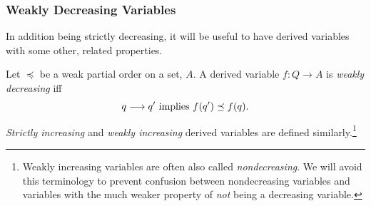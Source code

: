 \subsubsection{Weakly Decreasing Variables}

In addition being strictly decreasing, it will be useful to have derived
variables with some other, related properties.

\begin{definition}
Let $\preceq$ be a weak partial order on a set, $A$.  A derived variable
$f : Q \to A$ is \emph{weakly decreasing} iff
\[
q \mathrel{\longrightarrow} q' \text{  implies  } f(q') \preceq f(q).
\]

\emph{Strictly increasing} and \emph{weakly increasing} derived variables
are defined similarly.\footnote{Weakly increasing variables are often also
called \emph{nondecreasing}.  We will avoid this terminology to prevent
confusion between nondecreasing variables and variables with the much
weaker property of \emph{not} being a decreasing variable.}
\end{definition}
\fi

\begin{problems}
\practiceproblems
{}
\end{problems}

